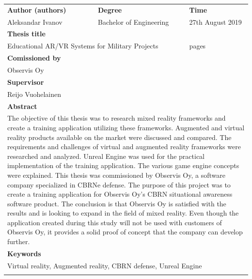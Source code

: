 \documentclass[12pt, a4paper,oneside, nocenter]{thesis}
\newcommand\blankpage{%
    \null
    \thispagestyle{empty}%
    \addtocounter{page}{-1}%
    \newpage}
\begin{document}
    \thispagestyle{empty}
		\noindent
		\newlength{\lengtha}
		\setlength{\lengtha}{.96\textwidth}
    \begin{tabularx}{\linewidth}{|XXXX|}
      \hline
	   \textbf{Author (authors)} &  \textbf{Degree} &  & \textbf{Time} \\
	   Aleksandar Ivanov &  \multicolumn{2}{l}{Bachelor of Engineering} & 27th August 2019 \\
	   \hline
	   \textbf{Thesis title} & & & \\
	   \multicolumn{3}{|l}{Educational AR/VR Systems for Military Projects} & \pageref{LastPage} pages\\
	  \hline
		\textbf{Comissioned by} & & & \\
		Observis Oy & & & \\
	  \hline
	  \textbf{Supervisor} & & & \\
	  Reijo Vuohelainen & & & \\
	  \hline
		\textbf{Abstract} & & & \\
		\multicolumn{4}{|p{\lengtha}|}{\raggedright \setstretch{1.0} The objective of this thesis was to research mixed reality frameworks and create a training application utilizing these frameworks. Augmented and virtual reality  products available on the market were discussed and compared. The requirements and challenges of virtual and augmented reality frameworks were researched and analyzed. Unreal Engine was used for the practical implementation of the training application. The various game engine concepts were explained. 
		\linebreak
		\linebreak
		This thesis was commissioned by Observis Oy, a software company specialized in CBRNe defense. The purpose of this project was to create a training application for Observis Oy's CBRN situational awareness software product. 
		\linebreak
		\linebreak
		The conclusion is that Observis Oy is satisfied with the results and is looking to expand in the field of mixed reality. Even though the application created during this study will not be used with customers of Observis Oy, it provides a solid proof of concept that the company can develop further.
		} \\
	  \hline
	  \textbf{Keywords} & & & \\
	  \multicolumn{4}{|p{\lengtha}|}{\raggedright \setstretch{1.0} Virtual reality, Augmented reality, CBRN defense, Unreal Engine } \\
	  & & & \\
	  \hline
    \end{tabularx}
\end{document}
